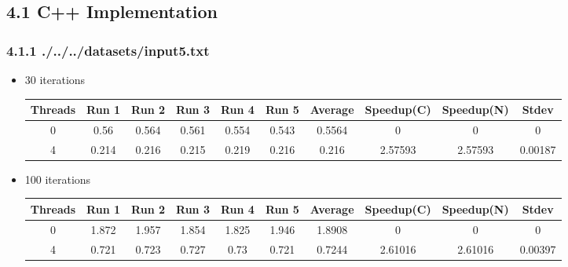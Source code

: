 \subsection*{4.1 C++ Implementation}\subsubsection*{4.1.1 ./../../datasets/input5.txt} 
 \begin{itemize}
\item 30 iterations
\begin{center}
 \begin{adjustbox}{width=\columnwidth, center} 
 \begin{tabular}{ | |c | c c c c c | c | c c | c | |} \hline 
 Threads & Run 1 & Run 2 & Run 3 & Run 4 & Run 5 & Average & Speedup(C) & Speedup(N) & Stdev \\ [0.5ex] 
 \hline 
 \hline 
0& 0.56 & 0.564 & 0.561 & 0.554 & 0.543 & 0.5564 & 0 & 0 & 0\\ 
 \hline
4& 0.214 & 0.216 & 0.215 & 0.219 & 0.216 & 0.216 & 2.57593 & 2.57593 & 0.00187\\ 
 \hline
\end{tabular} \end{adjustbox} \end{center}\item 100 iterations
\begin{center}
 \begin{adjustbox}{width=\columnwidth, center} 
 \begin{tabular}{ | |c | c c c c c | c | c c | c | |} \hline 
 Threads & Run 1 & Run 2 & Run 3 & Run 4 & Run 5 & Average & Speedup(C) & Speedup(N) & Stdev \\ [0.5ex] 
 \hline 
 \hline 
0& 1.872 & 1.957 & 1.854 & 1.825 & 1.946 & 1.8908 & 0 & 0 & 0\\ 
 \hline
4& 0.721 & 0.723 & 0.727 & 0.73 & 0.721 & 0.7244 & 2.61016 & 2.61016 & 0.00397\\ 
 \hline
\end{tabular} \end{adjustbox} \end{center}\end{itemize}